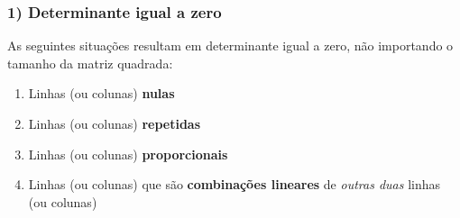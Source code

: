 \documentclass[pdftex, brazil, aspectratio=169]{beamer}
\begin{document}
\begin{frame}[t]
  \frametitle{1) Determinante igual a zero}
  As seguintes situações resultam em determinante igual a zero, não importando
  o tamanho da matriz quadrada:
    \begin{enumerate}
      \item Linhas (ou colunas) \textbf{nulas}
      \item Linhas (ou colunas) \textbf{repetidas}
      \item Linhas (ou colunas) \textbf{proporcionais}
      \item Linhas (ou colunas) que são \textbf{combinações lineares} de \emph{outras
        duas} linhas (ou colunas)
    \end{enumerate}
\end{frame}
\end{document}
